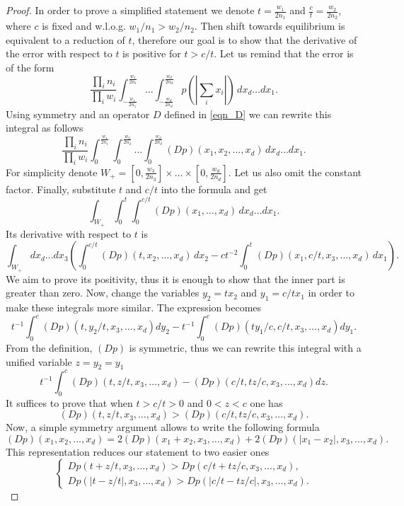 \documentclass{amsart}
\theoremstyle{remark}
\numberwithin{equation}{section}
\numberwithin{figure}{section}
\begin{document}
\begin{proof}
	
	In order to prove a simplified statement we denote $t = \frac{w_1}{2n_1}$ and $\frac{c}{t} = \frac{w_2}{2n_2}$, where $c$ is fixed and w.l.o.g. $w_1/n_1 > w_2/n_2$. Then shift towards equilibrium is equivalent to a reduction of $t$, therefore our goal is to show that the derivative of the error with respect to $t$ is positive for $t > c/t$. Let us remind that the error is of the form
	\[
	 \frac{\prod_i n_i}{\prod_i w_i} \int_{-\frac{w_1}{2n_1}}^{\frac{w_1}{2n_1}}\ldots \int_{-\frac{w_d}{2n_d}}^{\frac{w_d}{2n_d}} p\left(\left|\sum_{i} x_i\right|\right)\, dx_d \ldots dx_1.
	 \]
	Using symmetry and an operator $D$ defined in \eqref{eqn_D} we can rewrite this integral as follows
	\[
	\frac{\prod_i n_i}{\prod_i w_i} \int_{0}^{\frac{w_1}{2n_1}} \int_{0}^{\frac{w_2}{2n_2}} \ldots \int_0^{\frac{w_d}{2n_d}}(Dp)(x_1, x_2, \ldots, x_d)\,dx_d \ldots dx_1.
	\]
	For simplicity denote $W_{+} = [0, \frac{w_3}{2n_3}] \times \ldots \times [0, \frac{w_d}{2n_d}]$. Let us also omit the constant factor. Finally, substitute $t$ and $c/t$ into the formula and get
	\[
	\int_{W_+}\int_0^t \int_0^{c/t} (Dp) (x_1, \ldots, x_d) \, dx_d \ldots dx_1.
	\]
	Its derivative with respect to $t$ is
	\[
	\int_{W_+} dx_d \ldots dx_3 \left(\int_0^{c/t} (Dp)(t, x_2, \ldots, x_d) \, dx_2 - c t^{-2} \int_0^t (Dp) (x_1, c/t, x_3, \ldots, x_d) \, dx_1\right).
	\]
	We aim to prove its positivity, thus it is enough to show that the inner part is greater than zero. Now, change the variables $y_2 = t x_2$ and $y_1 = c/t x_1$ in order to make these integrals more similar. The expression becomes
	\[
	t^{-1}\int_0^c (Dp) (t, y_2/t, x_3, \ldots, x_d) dy_2 - t^{-1} \int_0^c (Dp) (ty_1/c, c/t, x_3, \ldots, x_d) dy_1.
	\]
	From the definition, $(Dp)$ is symmetric, thus we can rewrite this integral with a unified variable $z = y_2 = y_1$ 
	\[
	t^{-1}\int_0^c (Dp)(t, z/t, x_3, \ldots, x_d) - (Dp)(c/t, tz/c, x_3, \ldots, x_d ) dz.
	\]
	It suffices to prove that when $t > c/t > 0$ and $0 < z < c$ one has
	\[
	(Dp)(t, z/t, x_3, \ldots, x_d)  > (Dp) (c/t, tz/c, x_3, \ldots, x_d).
	\]
	Now, a simple symmetry argument allows to write the following formula
	\[
	(Dp)(x_1, x_2, \ldots, x_d) = 2(Dp)(x_1 + x_2, x_3, \ldots, x_d) + 2(Dp)(|x_1 - x_2|, x_3, \ldots, x_d).
	\]
	This representation reduces our statement to two easier ones
	\[
	\begin{cases}
	Dp(t + z/t, x_3, \ldots, x_d) > Dp(c/t + tz/c, x_3, \ldots, x_d), \\
	Dp(|t - z/t|, x_3, \ldots, x_d) > Dp(|c/t - tz/c|, x_3, \ldots, x_d).
	\end{cases}
\]
\end{proof}
\end{document}

